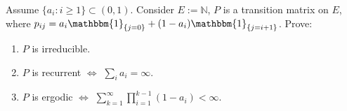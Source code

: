 \documentclass{ctexart}
\begin{document}
%
%
\begin{problem}\label{pro:5}
  Assume \(\{a_i: i \geq 1\} \subset (0,1)\). Consider \(E:=\mathbb{N}\), \(P\) is a transition matrix on \(E\),
  where \(p_{ij}=a_i \mathbbm{1}_{\{j=0\}} + (1-a_i)\mathbbm{1}_{\{j=i+1\}}\).
  Prove:
  \begin{enumerate}
    \item \(P\) is irreducible.
    \item \(P\) is recurrent \( \iff \) \(\sum_{i}a_i=\infty\).
    \item \(P\) is ergodic \(\iff \) \(\sum_{k=1}^{\infty} \prod_{i=1}^{k-1} (1-a_i)< \infty\).
  \end{enumerate}
\end{problem}
\end{document}
